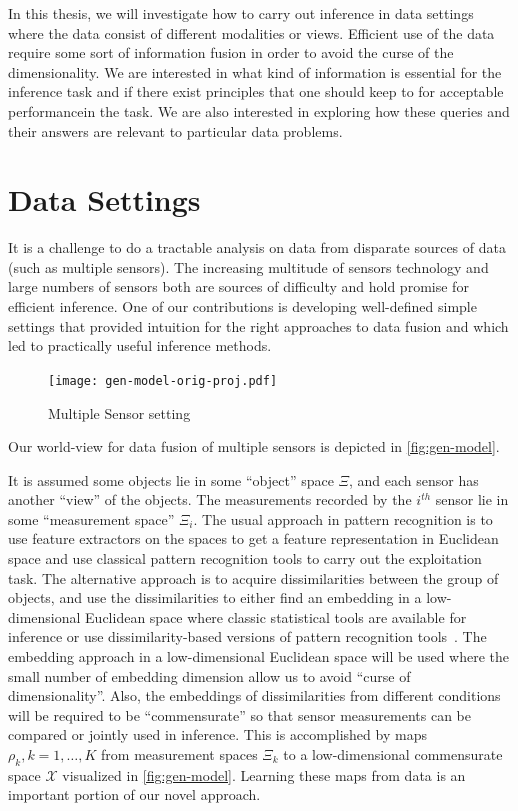 \documentclass[12pt,oneside,final]{thesis}\usepackage[]{graphicx}\usepackage[]{color}
\begin{document}
In this thesis, we will investigate how to carry out inference in  data  settings where the data consist of different modalities or views. Efficient use of the data require some sort of information fusion in order to avoid the curse of the dimensionality. We are interested in what kind of information is essential for the inference task and if there exist principles that one should keep to for acceptable performancein the task. We are also interested in exploring how these  queries and their answers are  relevant to  particular data problems.

\section{Data Settings}


 It is a challenge  to do a tractable analysis on data from disparate sources of data (such as multiple sensors). The increasing multitude  of sensors technology and large numbers of sensors both are  sources of difficulty and hold promise for efficient inference. One of our contributions is developing well-defined simple settings that provided intuition for the right approaches to data fusion and which led to practically useful inference methods.
 
 
\begin{figure}
\centering
\texttt{[image: gen-model-orig-proj.pdf]}
\caption{Multiple Sensor setting \label{fig:gen-model}}
\end{figure}

 Our world-view for data fusion of multiple sensors is depicted in \autoref{fig:gen-model}.


It is assumed some objects lie in some ``object'' space $\Xi$, and each sensor has another ``view'' of the objects. The measurements recorded by the $i^{th}$ sensor lie in some ``measurement space'' $\Xi_i$. The usual approach in pattern recognition is to use feature extractors on the spaces to get a feature representation in Euclidean space and use classical pattern recognition tools to carry out the exploitation task. The alternative approach is to acquire dissimilarities between the group of objects, and use the dissimilarities to either find an embedding in a low-dimensional Euclidean space where classic statistical tools are available for inference or use dissimilarity-based versions of pattern recognition tools~\cite{duin2005dissimilarity}. The embedding approach in a  low-dimensional Euclidean space will be used where the small number of embedding dimension allow us to avoid ``curse of dimensionality''. Also, the embeddings of dissimilarities from  different conditions will be required to be ``commensurate'' so that sensor measurements can be compared or jointly used in inference. This is accomplished by maps $\rho_k,k=1,\ldots,K$ from measurement spaces $\Xi_k$ to a low-dimensional commensurate space $\mathcal{X}$ visualized in \autoref{fig:gen-model}. Learning these maps from data is  an important portion of our novel  approach.
\label{sec:data}
\end{document}
